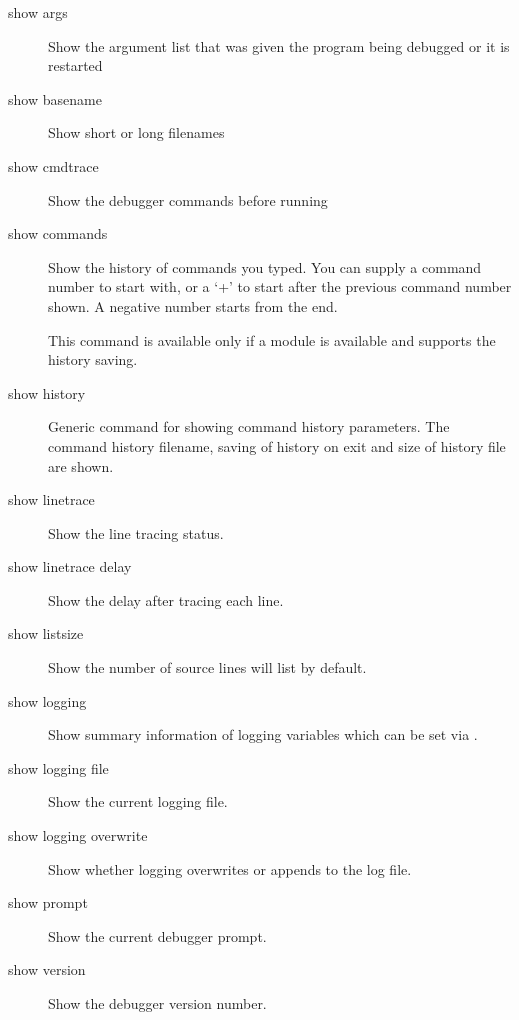 \begin{description}

\item[show args]

Show the argument list that was given the program being debugged or it is
restarted

\item[show basename]

Show short or long filenames

\item[show cmdtrace]

Show the debugger commands before running

\item[show commands]

Show the history of commands you typed. You can supply a command
number to start with, or a `+' to start after the previous command
number shown.  A negative number starts from the end.

This command is available only if a
module is available and supports the history saving.

\item[show history]

Generic command for showing command history parameters. The command
history filename, saving of history on exit and size of history file
are shown.

\item[show linetrace]

Show the line tracing status.

\item[show linetrace delay]

Show the delay after tracing each line.

\item[show listsize]

Show the number of source lines  will list by default.

\item[show logging]

Show summary information of logging variables which can be set via
.

\item[show logging file]

Show the current logging file.

\item[show logging overwrite]

Show whether logging overwrites or appends to the log file.

\item[show prompt]

Show the current debugger prompt.

\item[show version]

Show the debugger version number.

\end{description}

